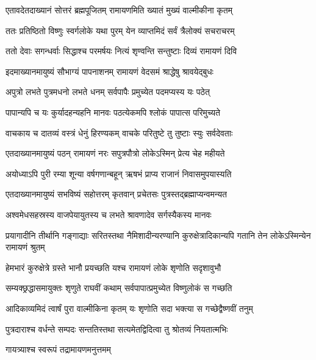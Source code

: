 
\twolineshloka
{एतावदेतदाख्यानं सोत्तरं ब्रह्मपूजितम्}
{रामायणमिति ख्यातं मुख्यं वाल्मीकीना कृतम्} %

\twolineshloka
{ततः प्रतिष्ठितो विष्णुः स्वर्गलोके यथा पुरम्}
{येन व्याप्तमिदं सर्वं त्रैलोक्यं सचराचरम्} %

\twolineshloka
{ततो देवाः सगन्धर्वाः सिद्धाश्च परमर्षयः}
{नित्यं शृण्वन्ति सन्तुष्टाः दिव्यं रामायणं दिवि} %

\twolineshloka
{इदमाख्यानमायुष्यं सौभाग्यं पापनाशनम्}
{रामायणं वेदसमं श्राद्धेषु श्रावयेद्बुधः} %

\twolineshloka
{अपुत्रो लभते पुत्रमधनो लभते धनम्}
{सर्वपापैः प्रमुच्येत पदमप्यस्य यः पठेत्} %

\twolineshloka
{पापान्यपि च यः कुर्यादहन्यहनि मानवः}
{पठत्येकमपि श्लोकं पापात्स परिमुच्यते} %

\twolineshloka
{वाचकाय च दातव्यं वस्त्रं धेनुं हिरण्यकम्}
{वाचके परितुष्टे तु तुष्टाः स्युः सर्वदेवताः} %

\twolineshloka
{एतदाख्यानमायुष्यं पठन् रामायणं नरः}
{सपुत्रपौत्रो लोकेऽस्मिन् प्रेत्य चेह महीयते} %

\twolineshloka
{अयोध्याऽपि पुरी रम्या शून्या वर्षगणान्बहून्}
{ऋषभं प्राप्य राजानं निवासमुपयास्यति} %

\twolineshloka
{एतदाख्यानमायुष्यं सभविष्यं सहोत्तरम्}
{कृतवान् प्रचेतसः पुत्रस्तद्ब्रह्माप्यन्वमन्यत} %

\twolineshloka
{अश्वमेधसहस्रस्य वाजपेयायुतस्य च}
{लभते श्रावणादेव सर्गस्यैकस्य मानवः} %

\threelineshloka
{प्रयागादीनि तीर्थानि गङ्गाद्याः सरितस्तथा}
{नैमिशादीन्यरण्यानि कुरुक्षेत्रादिकान्यपि}
{गतानि तेन लोकेऽस्मिन्येन रामायणं श्रुतम्} %

\twolineshloka
{हेमभारं कुरुक्षेत्रे ग्रस्ते भानौ प्रयच्छति}
{यश्च रामायणं लोके शृणोति सदृशावुभौ} %

\twolineshloka
{सम्यक्छ्रद्धासमायुक्तः शृणुते राघवीं कथाम्}
{सर्वपापात्प्रमुच्येत विष्णुलोकं स गच्छति} %

\twolineshloka
{आदिकाव्यमिदं त्वार्षं पुरा वाल्मीकिना कृतम्}
{यः शृणोति सदा भक्त्या स गच्छेद्वैष्णवीं तनुम्} %

\twolineshloka
{पुत्रदाराश्च वर्धन्ते सम्पदः सन्ततिस्तथा}
{सत्यमेतद्विदित्वा तु श्रोतव्यं नियतात्मभिः} %

\onelineshloka
{गायत्र्याश्च स्वरूपं तद्रामायणमनुत्तमम्} %

